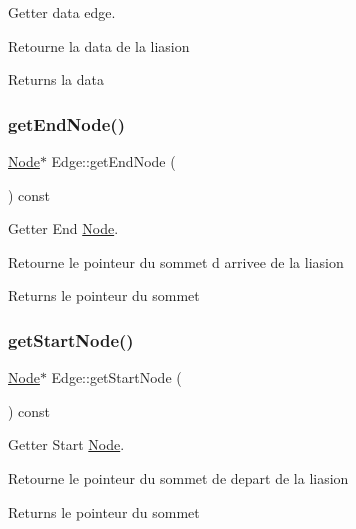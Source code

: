 Getter data edge. 

Retourne la data de la liasion

\begin{DoxyReturn}{Returns}
la data 
\end{DoxyReturn}
\mbox{\label{class_edge_a13748046f79d5550cfd712f71726290a}} 
\subsubsection{\texorpdfstring{get\+End\+Node()}{getEndNode()}}
{\footnotesize\ttfamily \mbox{\hyperlink{class_node}{Node}}$\ast$ Edge\+::get\+End\+Node (\begin{DoxyParamCaption}{ }\end{DoxyParamCaption}) const}



Getter End \mbox{\hyperlink{class_node}{Node}}. 

Retourne le pointeur du sommet d arrivee de la liasion

\begin{DoxyReturn}{Returns}
le pointeur du sommet 
\end{DoxyReturn}
\mbox{\label{class_edge_aa61208f51345a3c6e8bb794925e15993}} 
\subsubsection{\texorpdfstring{get\+Start\+Node()}{getStartNode()}}
{\footnotesize\ttfamily \mbox{\hyperlink{class_node}{Node}}$\ast$ Edge\+::get\+Start\+Node (\begin{DoxyParamCaption}{ }\end{DoxyParamCaption}) const}



Getter Start \mbox{\hyperlink{class_node}{Node}}. 

Retourne le pointeur du sommet de depart de la liasion

\begin{DoxyReturn}{Returns}
le pointeur du sommet 
\end{DoxyReturn}
\mbox{\label{class_edge_abf97244f7446b4192dfa1e87a156920d}} 
